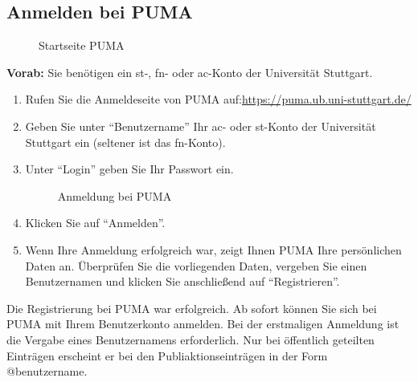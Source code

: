\subsection{Anmelden bei PUMA} 
\begin{figure}[h!]
 \centering
 \caption{Startseite PUMA}
 \label{figure777}
\end{figure}
\textbf{Vorab:} Sie benötigen ein st-, fn- oder ac-Konto der Universität Stuttgart.
\begin{enumerate}
    \item Rufen Sie die Anmeldeseite von PUMA auf:\newline \url{https://puma.ub.uni-stuttgart.de/}
    \item Geben Sie unter \enquote{Benutzername} Ihr ac- oder st-Konto der Universität Stuttgart ein (seltener ist das fn-Konto). 
    \item Unter  \enquote{Login} geben Sie Ihr Passwort ein. 
 \begin{figure}[h!]
 \centering
 \caption{Anmeldung bei PUMA}
 \label{figure2}
\end{figure}  
    \item Klicken Sie auf \enquote{Anmelden}.
    \item Wenn Ihre Anmeldung erfolgreich war, zeigt Ihnen PUMA Ihre persönlichen Daten an. Überprüfen Sie die vorliegenden Daten, vergeben Sie einen Benutzernamen und klicken Sie anschließend auf \enquote{Registrieren}.
\end{enumerate}
Die Registrierung bei PUMA war erfolgreich. Ab sofort können Sie sich bei PUMA mit Ihrem Benutzerkonto anmelden. \newline
Bei der erstmaligen Anmeldung ist die Vergabe eines Benutzernamens erforderlich. Nur bei öffentlich geteilten Einträgen erscheint er bei den Publiaktionseinträgen in der Form @benutzername.
